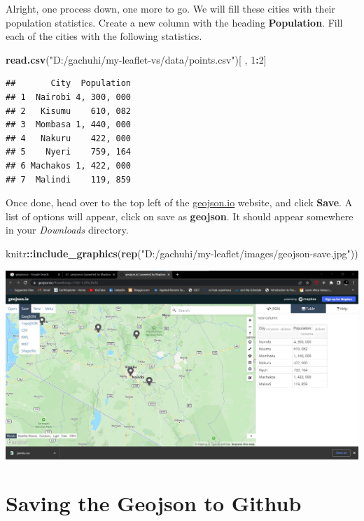 \documentclass[
]{book}
\newenvironment{Shaded}{\begin{snugshade}}{\end{snugshade}}
\newcommand{\DecValTok}[1]{\textcolor[rgb]{0.00,0.00,0.81}{#1}}
\newcommand{\FunctionTok}[1]{\textcolor[rgb]{0.13,0.29,0.53}{\textbf{#1}}}
\newcommand{\NormalTok}[1]{#1}
\newcommand{\SpecialCharTok}[1]{\textcolor[rgb]{0.81,0.36,0.00}{\textbf{#1}}}
\newcommand{\StringTok}[1]{\textcolor[rgb]{0.31,0.60,0.02}{#1}}
\begin{document}
Alright, one process down, one more to go. We will fill these cities with their population statistics. Create a new column with the heading \textbf{Population}. Fill each of the cities with the following statistics.

\begin{Shaded}
\begin{Highlighting}[]
\FunctionTok{read.csv}\NormalTok{(}\StringTok{"D:/gachuhi/my{-}leaflet{-}vs/data/points.csv"}\NormalTok{)[ , }\DecValTok{1}\SpecialCharTok{:}\DecValTok{2}\NormalTok{]}
\end{Highlighting}
\end{Shaded}

\begin{verbatim}
##       City  Population
## 1  Nairobi 4, 300, 000
## 2   Kisumu    610, 082
## 3  Mombasa 1, 440, 000
## 4   Nakuru    422, 000
## 5    Nyeri    759, 164
## 6 Machakos 1, 422, 000
## 7  Malindi    119, 859
\end{verbatim}

Once done, head over to the top left of the \href{http://geojson.io/}{geojson.io} website, and click \textbf{Save}. A list of options will appear, click on save as \textbf{geojson}. It should appear somewhere in your \emph{Downloads} directory.

\begin{Shaded}
\begin{Highlighting}[]
\NormalTok{knitr}\SpecialCharTok{::}\FunctionTok{include\_graphics}\NormalTok{(}\FunctionTok{rep}\NormalTok{(}\StringTok{"D:/gachuhi/my{-}leaflet/images/geojson{-}save.jpg"}\NormalTok{))}
\end{Highlighting}
\end{Shaded}

\includegraphics{../images/geojson-save.jpg}

\hypertarget{saving-the-geojson-to-github}{%
\section{Saving the Geojson to Github}\label{saving-the-geojson-to-github}}
\end{document}
